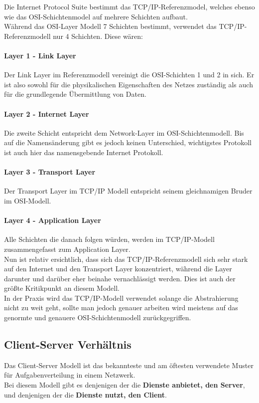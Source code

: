 \documentclass[12pt,a4paper]{report}
\begin{document}
Die Internet Protocol Suite bestimmt das TCP/IP-Referenzmodel, welches ebenso wie das OSI-Schichtenmodel auf mehrere Schichten aufbaut.\\
Während das OSI-Layer Modell 7 Schichten bestimmt, verwendet das TCP/IP-Referenzmodell nur 4 Schichten. Diese wären:\\

\paragraph{Layer 1 - Link Layer}
Der Link Layer im Referenzmodell vereinigt die OSI-Schichten 1 und 2 in sich. Er ist also sowohl für die physikalischen Eigenschaften des Netzes zuständig als auch für die grundlegende Übermittlung von Daten.

\paragraph{Layer 2 - Internet Layer}
Die zweite Schicht entspricht dem Network-Layer im OSI-Schichtenmodell. Bis auf die Namensänderung gibt es jedoch keinen Unterschied, wichtigstes Protokoll ist auch hier das namensgebende Internet Protokoll.

\paragraph{Layer 3 - Transport Layer}
Der Transport Layer im TCP/IP Modell entspricht seinem gleichnamigen Bruder im OSI-Modell. 

\paragraph{Layer 4 - Application Layer}
Alle Schichten die danach folgen würden, werden im TCP/IP-Modell zusammengefasst zum Application Layer.\\

Nun ist relativ ersichtlich, dass sich das TCP/IP-Referenzmodell sich sehr stark auf den Internet und den Transport Layer konzentriert, während die Layer darunter und darüber eher beinahe vernachlässigt werden. Dies ist auch der größte Kritikpunkt an diesem Modell.\\
In der Praxis wird das TCP/IP-Modell verwendet solange die Abstrahierung nicht zu weit geht, sollte man jedoch genauer arbeiten wird meistens auf das genormte und genauere OSI-Schichtenmodell zurückgegriffen.
\subsection{Client-Server Verhältnis}
Das Client-Server Modell ist das bekannteste und am öftesten verwendete Muster für Aufgabenverteilung in einem Netzwerk.\\ 
Bei diesem Modell gibt es denjenigen der die \textbf{Dienste anbietet, den Server}, und denjenigen der die \textbf{Dienste nutzt, den Client}.\\
\end{document}
